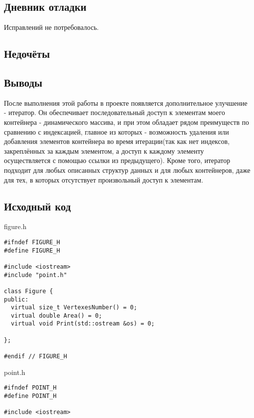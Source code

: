 \documentclass[12pt]{article}
\begin{document}
{\begin{enumerate}
\end{enumerate}

\subsection*{Дневник отладки}
Исправлений не потребовалось.


\subsection*{Недочёты}


\subsection*{Выводы}
После выполнения этой работы в проекте появляется дополнительное улучшение - итератор. Он обеспечивает последовательный доступ к элементам моего контейнера - динамического массива, и при этом обладает рядом преимуществ по сравнению с индексацией, главное из которых - возможность удаления или добавления элементов контейнера во время итерации(так как нет индексов, закреплённых за каждым элементом, а доступ к каждому элементу осуществляется с помощью ссылки из предыдущего). Кроме того, итератор подходит для любых описанных структур данных и для любых контейнеров, даже для тех, в которых отсутствует произвольный доступ к элементам.

\vfill

\subsection*{Исходный код}

{\Huge figure.h}
\begin{verbatim}
#ifndef FIGURE_H
#define FIGURE_H

#include <iostream>
#include "point.h"

class Figure {
public:
  virtual size_t VertexesNumber() = 0;
  virtual double Area() = 0;
  virtual void Print(std::ostream &os) = 0;

};

#endif // FIGURE_H

\end{verbatim}
    \pagebreak

\begin{flushleft}
{\Huge point.h}
\begin{verbatim}
#ifndef POINT_H
#define POINT_H

#include <iostream>


\end{verbatim}
\end{flushleft}}
\end{document}
